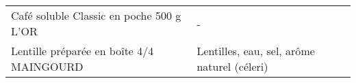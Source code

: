 \begin{longtable}{p{5cm}p{10cm}}
                                                                 Café soluble Classic en poche 500 g L'OR &                                                                                                                                                                                                                                                                                                                                                                                                                                                                                                                                                                                                                                                                                                                                                                                                                                                                                                                                                                                                                                        - \\
                                                                 Lentille préparée en boîte 4/4 MAINGOURD &                                                                                                                                                                                                                                                                                                                                                                                                                                                                                                                                                                                                                                                                                                                                                                                                                                                                                                                                                                                              Lentilles, eau, sel, arôme naturel (céleri) \\

\end{longtable}
